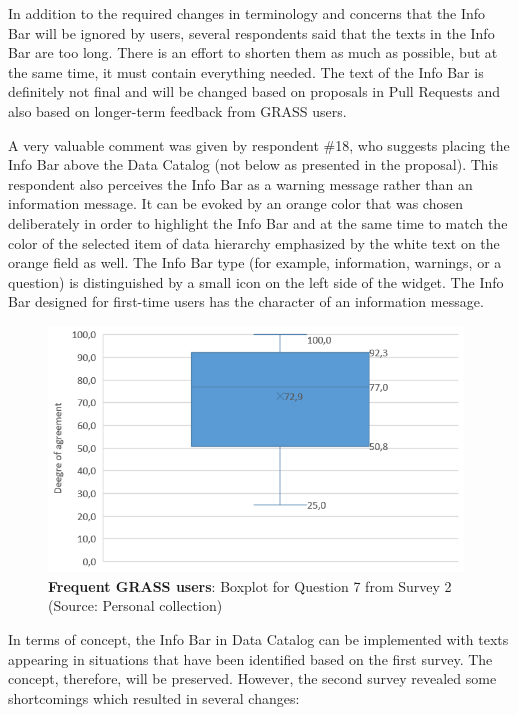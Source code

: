 \documentclass[a4paper,10pt,twoside]{article}
\begin{document}
\noindent In addition to the required changes in terminology and
concerns that the Info Bar will be ignored by users, several
respondents said that the texts in the Info Bar are too long. There is
an effort to shorten them as much as possible, but at the same time,
it must contain everything needed. The text of the Info Bar is
definitely not final and will be changed based on proposals in Pull
Requests and also based on longer-term feedback from GRASS users.

A very valuable comment was given by respondent \#18, who suggests
placing the Info Bar above the Data Catalog (not below as presented in
the proposal). This respondent also perceives the Info Bar as a
warning message rather than an information message. It can be evoked
by an orange color that was chosen deliberately in order to highlight
the Info Bar and at the same time to match the color of the selected
item of data hierarchy emphasized by the white text on the orange
field as well. The Info Bar type (for example, information, warnings,
or a question) is distinguished by a small icon on the left side of
the widget. The Info Bar designed for first-time users has the
character of an information message.

\vspace{0.3cm}
\begin{figure}[hbt!] 
\begin{center}
\includegraphics[width=11cm]{../surveys/analyzed_data/survey2_question7_boxplot_group2.png} 
\caption[\textbf{Frequent GRASS users}: Boxplot for Question 7 from Survey 2]{\textbf{Frequent GRASS users}: Boxplot for Question 7 from Survey 2 (Source: Personal collection)}
\label{fig:survey2_question7_boxplot_group2}
\end{center}
\end{figure}

\noindent In terms of concept, the Info Bar in Data Catalog can be
implemented with texts appearing in situations that have been
identified based on the first survey. The concept, therefore, will be
preserved. However, the second survey revealed some shortcomings which
resulted in several changes:
\end{document}
